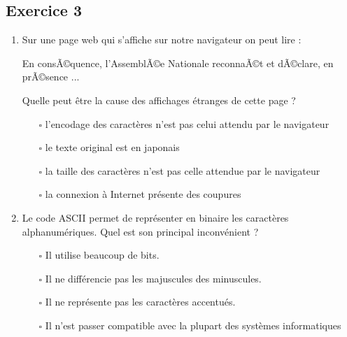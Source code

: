 \documentclass[11pt,a4paper]{article}
\renewcommand{\theenumi}{\textbf{\arabic{enumi}}}
\renewcommand{\labelenumi}{\textbf{\theenumi.}}
\providecommand{\tightlist}{\setlength{\itemsep}{0pt}\setlength{\parskip}{0pt}}
\begin{document}
 

\hypertarget{octicons-pencil-16-exercice-3}{%
\subsection*{\faPencil* Exercice
3}\label{octicons-pencil-16-exercice-3}}

\begin{enumerate}
\def\labelenumi{\arabic{enumi}.}
\tightlist
\item
  Sur une page web qui s'affiche sur notre navigateur on peut lire :

\begin{center}
\begin{minipage}{10cm}
En consÃ\copyright quence, l'AssemblÃ\copyright e Nationale reconnaÃ\copyright t et dÃ\copyright clare, en
prÃ\copyright sence ...
\end{minipage}
\end{center}
 

Quelle peut être la cause des affichages étranges de cette page ?

\begin{itemize}
\tightlist
\item[$\square$]
  l'encodage des caractères n'est pas celui attendu par le navigateur
\item[$\square$]
  le texte original est en japonais
\item[$\square$]
  la taille des caractères n'est pas celle attendue par le navigateur
\item[$\square$]
  la connexion à Internet présente des coupures
\end{itemize}

\newpage

\item
  Le code ASCII permet de représenter en binaire les caractères
  alphanumériques. Quel est son principal inconvénient ?

\begin{itemize}
\tightlist
\item[$\square$]
  Il utilise beaucoup de bits.
\item[$\square$]
  Il ne différencie pas les majuscules des minuscules.
\item[$\square$]
  Il ne représente pas les caractères accentués.
\item[$\square$]
  Il n'est passer compatible avec la plupart des systèmes informatiques
\end{itemize}

\end{enumerate}
\end{document}
